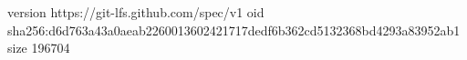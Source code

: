 version https://git-lfs.github.com/spec/v1
oid sha256:d6d763a43a0aeab2260013602421717dedf6b362cd5132368bd4293a83952ab1
size 196704
